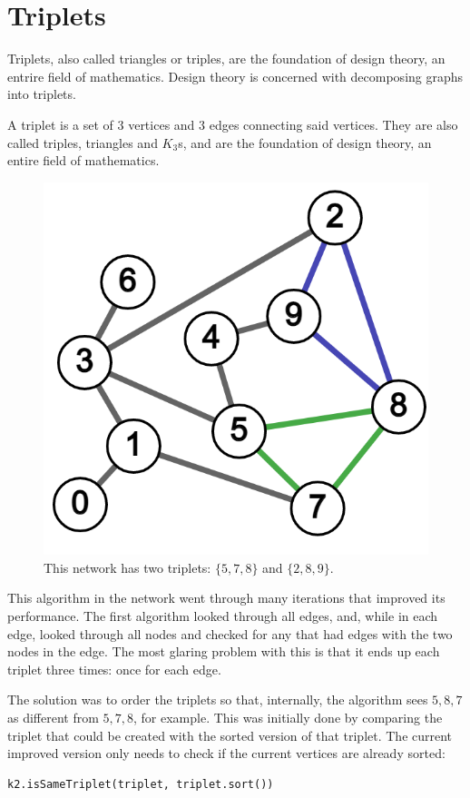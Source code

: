 \section{Triplets}

Triplets, also called triangles or triples, are the foundation
of design theory, an entrire field of mathematics.
Design theory is concerned with decomposing graphs into triplets.

A triplet is a set of 3 vertices and 3 edges connecting said vertices.
They are also called triples, triangles and $K_3$s, and are the foundation of design theory,
an entire field of mathematics.
\begin{figure}[H]
  \centering
  \includegraphics[scale=.25]{img/triplets.png}
  \caption{This network has two triplets: $\{5,7,8\}$ and $\{2,8,9\}$.}
  \label{fig:core_ex}
\end{figure}
This algorithm in the network went through many iterations that improved its performance.
The first algorithm looked through all edges, and, while in each edge,
looked through all nodes and checked for any that had edges with the two nodes in the edge.
The most glaring problem with this is that it ends up each triplet three times:
once for each edge.

The solution was to order the triplets so that, internally, the algorithm
sees $5,8,7$ as different from $5,7,8$, for example.
This was initially done by comparing the triplet that could be created
with the sorted version of that triplet.
The current improved version only needs to check if the current vertices are already sorted:
\begin{verbatim}
k2.isSameTriplet(triplet, triplet.sort())
\end{verbatim}

